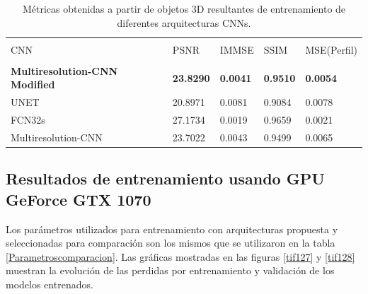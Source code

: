 \documentclass[10pt,letterpaper]{article}
\begin{document}
\begin{table}[H]
\caption{Métricas obtenidas a partir de objetos 3D resultantes de entrenamiento de diferentes arquitecturas CNNs.}
\begin{center}
\begin{tabular}{p{2.5cm}p{1.5cm}p{1.5cm}p{1.5cm}p{1.5cm}}
\hline\\
CNN & PSNR & IMMSE & SSIM & MSE(Perfil) \\
\hline\\
\textbf{Multiresolution-CNN Modified}  & \textbf{23.8290} & \textbf{0.0041} & \textbf{0.9510} & \textbf{0.0054} \\
UNET                & 20.8971 & 0.0081 & 0.9084 & 0.0078 \\
FCN32s              & 27.1734 & 0.0019 & 0.9659 & 0.0021 \\
Multiresolution-CNN & 23.7022 & 0.0043 & 0.9499 & 0.0065 \\[2pt]
\hline
\end{tabular}
\label{tabla1}
\end{center}
\end{table}


\subsection*{Resultados de entrenamiento usando GPU GeForce GTX 1070}
Los parámetros utilizados para entrenamiento con arquitecturas propuesta y seleccionadas para comparación son los mismos que se utilizaron en la tabla \ref{Parametroscomparacion}. Las gráficas mostradas en las figuras \ref{tif127} y \ref{tif128} muestran la evolución de las perdidas por entrenamiento y validación de los modelos entrenados.
\end{document}
